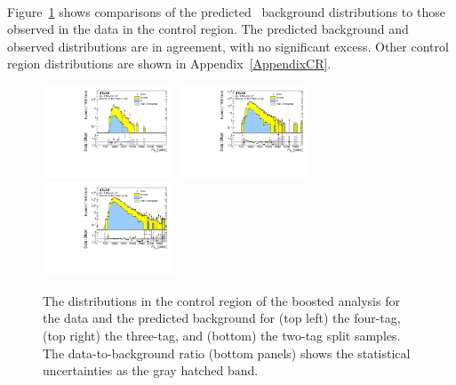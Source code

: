 \paragraph{}
Figure~\ref{fig:boosted-cr-mjj} shows comparisons of the predicted \mtwoJ~background distributions to those observed in the data in the control region.
The predicted background and observed distributions are in agreement, with no significant excess.
Other control region distributions are shown in Appendix~\ref{AppendixCR}.

\begin{figure}[htbp!]
\begin{center}
 \includegraphics[width=0.35\textwidth,angle=-90]{figures/boosted/Paperplot/Moriond_bkg_9_FourTag_Control_mHH_l_1.pdf}
 \includegraphics[width=0.35\textwidth,angle=-90]{figures/boosted/Paperplot/Moriond_bkg_9_ThreeTag_Control_mHH_l_1.pdf}\\
 \includegraphics[width=0.35\textwidth,angle=-90]{figures/boosted/Paperplot/Moriond_bkg_9_TwoTag_split_Control_mHH_l_1.pdf}\\
\caption{The \mtwoJ distributions in the control region of the boosted analysis for the data and the predicted background for (top left) the four-tag, (top right) the three-tag, and (bottom) the two-tag split samples. The data-to-background ratio (bottom panels) shows the statistical uncertainties as the gray hatched band.}
\label{fig:boosted-cr-mjj}
\end{center}
\end{figure}



